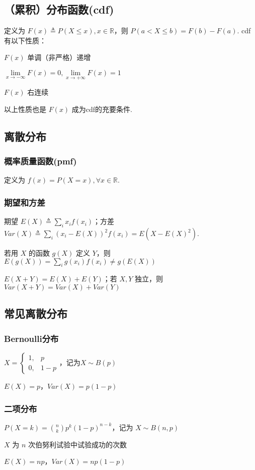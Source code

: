 \documentclass[./main.tex]{subfiles}
\begin{document}
\subsection{（累积）分布函数(cdf)}
\noindent 定义为 $F(x)\triangleq P(X\le x), x\in\mathbb{R}$，则 $P(a<X\le b)=F(b)-F(a)$. cdf有以下性质：
\begin{enumerate*}
    \item $F(x)$ 单调（非严格）递增
    \item $\lim\limits_{x\rightarrow-\infty}F(x)=0,\lim\limits_{x\rightarrow+\infty}F(x)=1$
    \item $F(x)$ 右连续
\end{enumerate*}
以上性质也是 $F(x)$ 成为cdf的充要条件. 
\subsection{离散分布}
\subsubsection{概率质量函数(pmf)}
定义为 $f(x)=P(X=x), \forall x\in\mathbb{R}$. 
\subsubsection{期望和方差}
期望 $E(X)\triangleq \sum_ix_if(x_i)$；方差 $Var(X)\triangleq\sum_i(x_i-E(X))^2f(x_i)=E(X-E(X)^2)$. 
\begin{enumerate*}
    \item 若用 $X$ 的函数 $g(X)$ 定义 $Y$，则 $E(g(X))=\sum_{i}g(x_i)f(x_i)\neq g(E(X))$
    \item $E(X+Y)=E(X)+E(Y)$；若 $X,Y$ 独立，则 $Var(X+Y)=Var(X)+Var(Y)$
\end{enumerate*}
\subsection{常见离散分布}
\subsubsection{Bernoulli分布}
\begin{itemize*}
    \item $X=\begin{cases}1,&p\\0,&1-p\end{cases}$，记为$X\sim B(p)$
    \item $E(X)=p$，$Var(X)=p(1-p)$
\end{itemize*}
\subsubsection{二项分布}
\begin{itemize*}
    \item $P(X=k)=\binom{n}{k}p^k(1-p)^{n-k}$，记为 $X\sim B(n,p)$
    \item $X$ 为 $n$ 次伯努利试验中试验成功的次数
    \item $E(X)=np$，$Var(X)=np(1-p)$
\end{itemize*}
\end{document}
